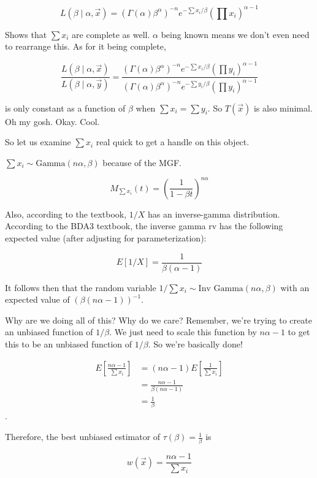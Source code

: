 \[
	L(\beta \mid \alpha, \vec{x}) = (\Gamma(\alpha)\beta^{\alpha})^{-n} e^{-\sum x_i / \beta} \left( \prod x_i \right)^{\alpha - 1} 
\]

Shows that $\sum x_i$ are complete as well. $\alpha$ being known means we don't even need to rearrange this. As for it being complete,

\[
	\frac{L(\beta \mid \alpha, \vec{x})}{L(\beta \mid \alpha, \vec{y})} = 
	\frac{(\Gamma(\alpha)\beta^{\alpha})^{-n} e^{-\sum x_i / \beta} \left( \prod y_i \right)^{\alpha - 1} 
}
	{(\Gamma(\alpha)\beta^{\alpha})^{-n} e^{-\sum y_i / \beta} \left( \prod y_i \right)^{\alpha - 1} 
}
\]

is only constant as a function of $\beta$ when $\sum x_i = \sum y_i$. So $T(\vec{x})$ is also minimal. Oh my gosh. Okay. Cool. 

So let us examine $\sum x_i$ real quick to get a handle on this object.

$\sum x_i \sim \text{Gamma}(n\alpha, \beta)$ because of the MGF.

\[
	M_{\sum x_i}(t) = \left( \frac{1}{1 - \beta t} \right)^{n\alpha}
\]

Also, according to the textbook, $1/X$ has an inverse-gamma distribution. According to the BDA3 textbook, the inverse gamma rv has the following expected value (after adjusting for parameterization):

\[
	E[1/X] = \frac{1}{\beta(\alpha-1)}
\]

It follows then that the random variable $1/\sum x_i \sim \text{Inv Gamma}(n\alpha, \beta)$ with an expected value of $(\beta(n\alpha-1))^{-1}$.

Why are we doing all of this? Why do we care? Remember, we're trying to create an unbiased function of $1/\beta$. We just need to scale this function by $n\alpha -1$ to get this to be an unbiased function of $1/\beta$. So we're basically done!

\begin{align*}
	E\left[ \frac{n\alpha - 1}{\sum x_i} \right] &= (n\alpha - 1) E\left[ \frac{1}{\sum x_i} \right] \\
	&= \frac{n\alpha - 1}{\beta(n\alpha - 1)} \\
	&= \frac{1}{\beta}
\end{align*}.

Therefore, the best unbiased estimator of $\tau(\beta) = \frac{1}{\beta}$ is

\[
	w(\vec{x}) = \frac{n\alpha - 1}{\sum x_i}
\]
